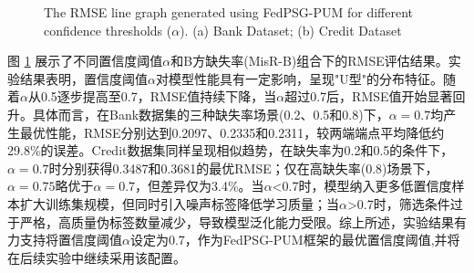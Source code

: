 \vspace{-0.1cm}
\begin{figure}[h]
	\centering
	\hspace{0.01\textwidth}  %
	
	{\centering \wuhao The RMSE line graph generated using FedPSG-PUM for different confidence thresholds ($\alpha$). (a) Bank Dataset; (b) Credit Dataset}    
	\label{Chapter4Exp1Setting3}
\end{figure}
\vspace{-0.35cm}

图 \ref{Chapter4Exp1Setting3} 展示了不同置信度阈值$\alpha$和B方缺失率(MisR-B)组合下的RMSE评估结果。实验结果表明，置信度阈值$\alpha$对模型性能具有一定影响，呈现"U型"的分布特征。随着$\alpha$从0.5逐步提高至0.7，RMSE值持续下降，当$\alpha$超过0.7后，RMSE值开始显著回升。具体而言，在Bank数据集的三种缺失率场景(0.2、0.5和0.8)下，$\alpha=0.7$均产生最优性能，RMSE分别达到0.2097、0.2335和0.2311，较两端端点平均降低约29.8\%的误差。Credit数据集同样呈现相似趋势，在缺失率为0.2和0.5的条件下，$\alpha=0.7$时分别获得0.3487和0.3681的最优RMSE；仅在高缺失率(0.8)场景下，$\alpha=0.75$略优于$\alpha=0.7$，但差异仅为3.4\%。当$\alpha$<0.7时，模型纳入更多低置信度样本扩大训练集规模，但同时引入噪声标签降低学习质量；当$\alpha$>0.7时，筛选条件过于严格，高质量伪标签数量减少，导致模型泛化能力受限。综上所述，实验结果有力支持将置信度阈值$\alpha$设定为0.7，作为FedPSG-PUM框架的最优置信度阈值,并将在后续实验中继续采用该配置。

